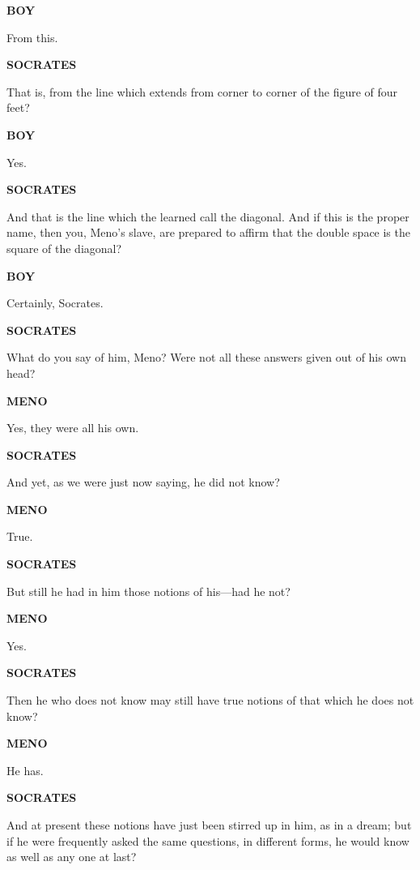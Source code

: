 \documentclass[11pt,letter]{article}
\begin{document}
\par \textbf{BOY}
\par   From this.

\par \textbf{SOCRATES}
\par   That is, from the line which extends from corner to corner of the figure of four feet?

\par \textbf{BOY}
\par   Yes.

\par \textbf{SOCRATES}
\par   And that is the line which the learned call the diagonal. And if this is the proper name, then you, Meno's slave, are prepared to affirm that the double space is the square of the diagonal?

\par \textbf{BOY}
\par   Certainly, Socrates.

\par \textbf{SOCRATES}
\par   What do you say of him, Meno? Were not all these answers given out of his own head?

\par \textbf{MENO}
\par   Yes, they were all his own.

\par \textbf{SOCRATES}
\par   And yet, as we were just now saying, he did not know?

\par \textbf{MENO}
\par   True.

\par \textbf{SOCRATES}
\par   But still he had in him those notions of his—had he not?

\par \textbf{MENO}
\par   Yes.

\par \textbf{SOCRATES}
\par   Then he who does not know may still have true notions of that which he does not know?

\par \textbf{MENO}
\par   He has.

\par \textbf{SOCRATES}
\par   And at present these notions have just been stirred up in him, as in a dream; but if he were frequently asked the same questions, in different forms, he would know as well as any one at last?
\end{document}
